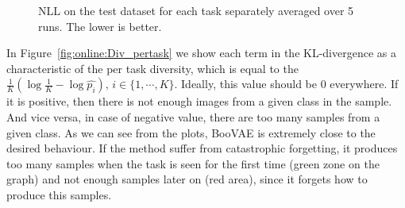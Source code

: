 \begin{figure}[t]
	\centering
		 \hfill
		\hfill
		\caption{NLL on the test dataset for each task separately averaged over 5 runs. The lower is better.}\label{fig:online:NLL_pertask}
\end{figure}
In Figure~\ref{fig:online:Div_pertask} we show each term in the KL-divergence as a characteristic of the per task diversity, which is equal to the $\tfrac1K \left(\log\tfrac1K - \log\hat{p_i}\right), \, i \in \{1, \cdots, K\}$. Ideally, this value should be 0 everywhere. If it is positive, then there is not enough images from a given class in the sample. And vice versa, in case of negative value, there are too many samples from a given class. As we can see from the plots, BooVAE is extremely close to the desired behaviour. If the method suffer from catastrophic forgetting, it produces too many samples when the task is seen for the first time (green zone on the graph) and not enough samples later on (red area), since it forgets how to produce this samples.
